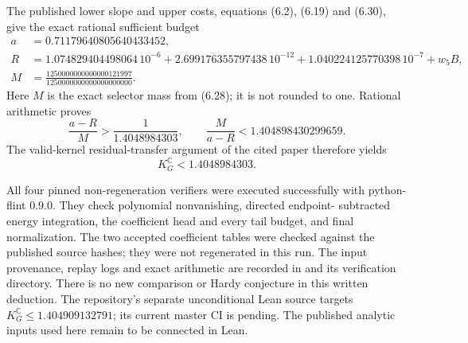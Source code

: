 The published lower slope and upper costs, equations (6.2), (6.19) and
(6.30), give the exact rational sufficient budget
\begin{align*}
 a&=0.71179640805640433452,\\
 R&=1.074829404498064\,10^{-6}
   +2.699176355797438\,10^{-12}
   +1.040224125770398\,10^{-7}
   +w_5 B,\\
 M&=\frac{1250000000000000121997}{1250000000000000000000}.
\end{align*}
Here $M$ is the exact selector mass from (6.28); it is not rounded to one.
Rational arithmetic proves
\[
 \frac{a-R}{M}>\frac1{1.4048984303},
 \qquad \frac{M}{a-R}<1.404898430299659.
\]
The valid-kernel residual-transfer argument of the cited paper therefore
yields
\[
 \boxed{K_G^{\mathbb C}<1.4048984303.}
\]

All four pinned non-regeneration verifiers were executed successfully with
python-flint 0.9.0. They check polynomial nonvanishing, directed endpoint-
subtracted energy integration, the coefficient head and every tail budget,
and final normalization. The two accepted coefficient tables were checked
against the published source hashes; they were not regenerated in this run.
The input provenance, replay logs and exact arithmetic are recorded in
 and its verification directory.
There is no new comparison or Hardy conjecture in this written deduction.
The repository's separate unconditional Lean source targets
$K_G^{\mathbb C}\le1.404909132791$; its current master CI is pending.
The published analytic inputs used here remain to be connected in Lean.
